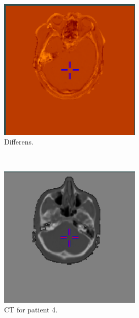 \begin{figure}[H]
\begin{subfigure}[b]{0.3\textwidth}
        \includegraphics[width=0.75\textwidth]{colager/loocv_ct/loocv_010850_sub.png}
        \caption{Differens.}
        \label{col:loocv_ct_pat3_sub}
    \end{subfigure}\\
    \begin{subfigure}[b]{0.3\textwidth}
        \centering
        \includegraphics[width=0.75\textwidth]{colager/loocv_ct/loocv_010960_ct.png}
        \caption{CT for patient 4.}
        \label{col:loocv_ct_pat4_ct}
    \end{subfigure}\hfill
    \begin{subfigure}[b]{0.3\textwidth}
        \centering

\end{subfigure}
\end{figure}
